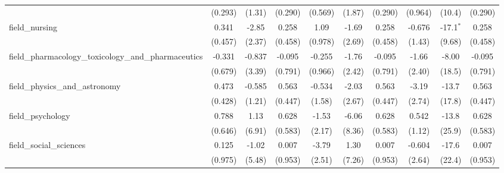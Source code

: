 \begin{tabular}{lccccccccc}
                                                               & (0.293)        & (1.31)         & (0.290)        & (0.569)        & (1.87)        & (0.290)        & (0.964)        & (10.4)         & (0.290)\\   
   field\_nursing                                              & 0.341          & -2.85          & 0.258          & 1.09           & -1.69         & 0.258          & -0.676         & -17.1$^{*}$    & 0.258\\   
                                                               & (0.457)        & (2.37)         & (0.458)        & (0.978)        & (2.69)        & (0.458)        & (1.43)         & (9.68)         & (0.458)\\   
   field\_pharmacology\_toxicology\_and\_pharmaceutics         & -0.331         & -0.837         & -0.095         & -0.255         & -1.76         & -0.095         & -1.66          & -8.00          & -0.095\\   
                                                               & (0.679)        & (3.39)         & (0.791)        & (0.966)        & (2.42)        & (0.791)        & (2.40)         & (18.5)         & (0.791)\\   
   field\_physics\_and\_astronomy                              & 0.473          & -0.585         & 0.563          & -0.534         & -2.03         & 0.563          & -3.19          & -13.7          & 0.563\\   
                                                               & (0.428)        & (1.21)         & (0.447)        & (1.58)         & (2.67)        & (0.447)        & (2.74)         & (17.8)         & (0.447)\\   
   field\_psychology                                           & 0.788          & 1.13           & 0.628          & -1.53          & -6.06         & 0.628          & 0.542          & -13.8          & 0.628\\   
                                                               & (0.646)        & (6.91)         & (0.583)        & (2.17)         & (8.36)        & (0.583)        & (1.12)         & (25.9)         & (0.583)\\   
   field\_social\_sciences                                     & 0.125          & -1.02          & 0.007          & -3.79          & 1.30          & 0.007          & -0.604         & -17.6          & 0.007\\   
                                                               & (0.975)        & (5.48)         & (0.953)        & (2.51)         & (7.26)        & (0.953)        & (2.64)         & (22.4)         & (0.953)\\   

\end{tabular}
